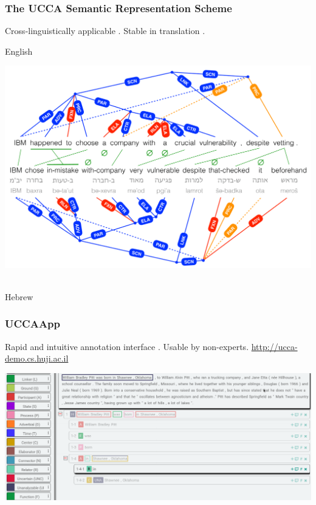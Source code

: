 \documentclass[t]{beamer}
\begin{document}
\begin{frame}
\frametitle{The UCCA Semantic Representation Scheme}
Cross-linguistically applicable \cite{abend2013universal}.
Stable in translation \cite{sulem2015conceptual}.

\vfill
English\\
\vspace{-1cm}
\begin{adjustbox}{center}
  \includegraphics[width=\textwidth,height=\textheight,keepaspectratio]{crosslinguistic.png}
\end{adjustbox}
\\
\vspace{-1cm}
Hebrew
\end{frame}

\begin{frame}
\frametitle{UCCAApp}
Rapid and intuitive annotation interface \cite{abend2017uccaapp}.
Usable by non-experts.
\footnotesize\url{http://ucca-demo.cs.huji.ac.il}
\vfill
\begin{adjustbox}{center}
  \includegraphics[width=\pagewidth,height=\textheight,keepaspectratio]{uccaapp.png}
\end{adjustbox}
\end{frame}
\end{document}
